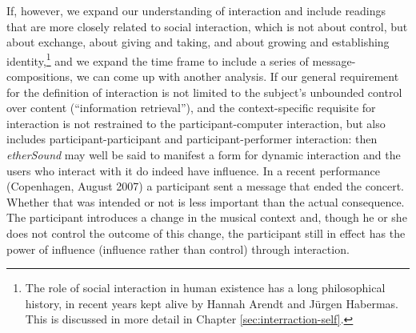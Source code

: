 If, however, we expand our understanding of interaction and include readings that are more closely related to social interaction, which is not about control, but about exchange, about giving and taking, and about growing and establishing identity,\footnote{The role of social interaction in human existence has a long philosophical history, in recent years kept alive by Hannah Arendt and J\"{u}rgen Habermas. This is discussed in more detail in Chapter \ref{sec:interraction-self}.} and we expand the time frame to include a series of message-compositions, we can come up with another analysis. If our general requirement for the definition of interaction is not limited to the subject's unbounded control over content (``information retrieval''), and the context-specific requisite for interaction is not restrained to the participant-computer interaction, but also includes participant-participant and participant-performer interaction: then \emph{etherSound} may well be said to manifest a form for dynamic interaction and the users who interact with it do indeed have influence.
In a recent performance (Copenhagen, August 2007) a participant sent a message that ended the concert. Whether that was intended or not is less important than the actual consequence. The participant introduces a change in the musical context and, though he or she does not control the outcome of this change, the participant still in effect has the power of influence (influence rather than control) through interaction. 

